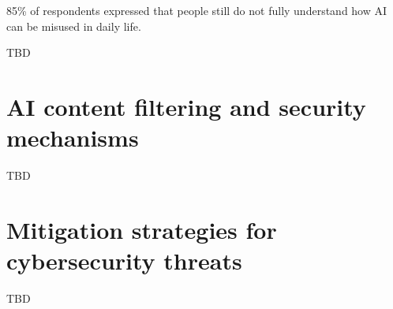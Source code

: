 85\% of respondents expressed that people still do not fully understand how AI can be misused in daily life.

TBD

\section{AI content filtering and security mechanisms}

TBD



\section{Mitigation strategies for cybersecurity threats}
TBD


